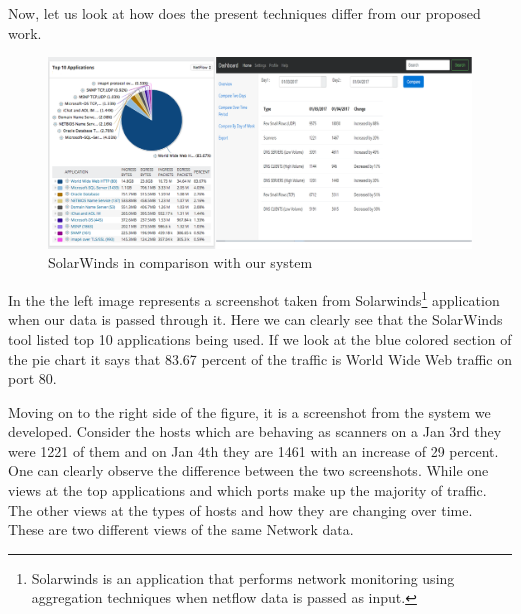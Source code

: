 Now, let us look at how does the present techniques differ from our proposed work.


\begin{figure}[t]
	\centerline{\includegraphics[scale = 0.6]{intro.png}}
	\caption{SolarWinds in comparison with our system}%
\end{figure}

In the  the left image represents a screenshot taken from Solarwinds\footnote{Solarwinds is an application that performs network monitoring using aggregation techniques when netflow data is passed as input.} application when our data is passed through it. Here we can clearly see that the SolarWinds tool listed top 10 applications being used. If we look at the blue colored section of the pie chart it says that 83.67 percent of the traffic is World Wide Web traffic on port 80. 

Moving on to the right side of the figure, it is a screenshot from the system we developed. Consider the hosts which are behaving as scanners on a Jan 3rd they were 1221 of them and on Jan 4th they are 1461 with an increase of 29 percent. One can clearly observe the difference between the two screenshots. While one views at the top applications and which ports make up the majority of traffic. The other views at the types of hosts and how they are changing over time. These are two different views of the same Network data.

